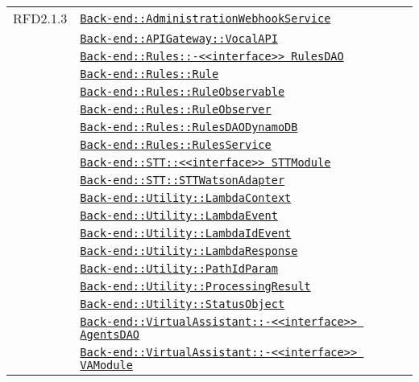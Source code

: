 \begin{longtable}{|>{\centering}m{3cm}|m{10cm}<{\centering}|}
RFD2.1.3 & \hyperref[Back-end::AdministrationWebhookService]{\texttt{Back-end::AdministrationWebhookService}}\\
& \hyperref[Back-end::APIGateway::VocalAPI]{\texttt{Back-end::APIGateway::VocalAPI}}\\
& \hyperref[Back-end::Rules::<<interface>> RulesDAO]{\texttt{Back-end::Rules::-\linebreak <<interface>> RulesDAO}}\\
& \hyperref[Back-end::Rules::Rule]{\texttt{Back-end::Rules::Rule}}\\
& \hyperref[Back-end::Rules::RuleObservable]{\texttt{Back-end::Rules::RuleObservable}}\\
& \hyperref[Back-end::Rules::RuleObserver]{\texttt{Back-end::Rules::RuleObserver}}\\
& \hyperref[Back-end::Rules::RulesDAODynamoDB]{\texttt{Back-end::Rules::RulesDAODynamoDB}}\\
& \hyperref[Back-end::Rules::RulesService]{\texttt{Back-end::Rules::RulesService}}\\
& \hyperref[Back-end::STT::<<interface>> STTModule]{\texttt{Back-end::STT::<<interface>> STTModule}}\\
& \hyperref[Back-end::STT::STTWatsonAdapter]{\texttt{Back-end::STT::STTWatsonAdapter}}\\
& \hyperref[Back-end::Utility::LambdaContext]{\texttt{Back-end::Utility::LambdaContext}}\\
& \hyperref[Back-end::Utility::LambdaEvent]{\texttt{Back-end::Utility::LambdaEvent}}\\
& \hyperref[Back-end::Utility::LambdaIdEvent]{\texttt{Back-end::Utility::LambdaIdEvent}}\\
& \hyperref[Back-end::Utility::LambdaResponse]{\texttt{Back-end::Utility::LambdaResponse}}\\
& \hyperref[Back-end::Utility::PathIdParam]{\texttt{Back-end::Utility::PathIdParam}}\\
& \hyperref[Back-end::Utility::ProcessingResult]{\texttt{Back-end::Utility::ProcessingResult}}\\
& \hyperref[Back-end::Utility::StatusObject]{\texttt{Back-end::Utility::StatusObject}}\\
& \hyperref[Back-end::VirtualAssistant::<<interface>> AgentsDAO]{\texttt{Back-end::VirtualAssistant::-\linebreak <<interface>> AgentsDAO}}\\
& \hyperref[Back-end::VirtualAssistant::<<interface>> VAModule]{\texttt{Back-end::VirtualAssistant::-\linebreak <<interface>> VAModule}}\\

\end{longtable}
